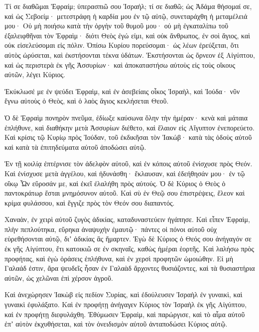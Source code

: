\begin{spacing}{1.1}
\begin{multicols}{2}
Τί σε διαθῶμαι Ἐφραίμ; ὑπερασπιῶ σου Ἰσραήλ; τί σε διαθῶ; ὡς Ἀδάμα θήσομαί σε, καὶ ὡς Σεβοείμ· μετεστράφη ἡ καρδία μου ἐν τῷ αὐτῷ, συνεταράχθη ἡ μεταμέλειά μου·
Οὐ μὴ ποιήσω κατὰ τὴν ὀργὴν τοῦ θυμοῦ μου· οὐ μὴ ἐγκαταλίπω τοῦ ἐξαλειφθῆναι τὸν Ἐφραὶμ· διότι Θεὸς ἐγώ εἰμι, καὶ οὐκ ἄνθρωπος, ἐν σοὶ ἅγιος, καὶ οὐκ εἰσελεύσομαι εἰς πόλιν.
Ὀπίσω Κυρίου πορεύσομαι· ὡς λέων ἐρεύξεται, ὅτι αὐτὸς ὠρύσεται, καὶ ἐκστήσονται τέκνα ὑδάτων.
Ἐκστήσονται ὡς ὄρνεον ἐξ Αἰγύπτου, καὶ ὡς περιστερὰ ἐκ γῆς Ἀσσυρίων· καὶ ἀποκαταστήσω αὐτοὺς εἰς τοὺς οἴκους αὐτῶν, λέγει Κύριος.

Ἐκύκλωσέ με ἐν ψεύδει Ἐφραὶμ, καὶ ἐν ἀσεβείαις οἶκος Ἰσραὴλ, καὶ Ἰούδα· νῦν ἔγνω αὐτοὺς ὁ Θεὸς, καὶ ὁ λαὸς ἅγιος κεκλήσεται Θεοῦ.

Ὁ δὲ Ἐφραὶμ πονηρὸν πνεῦμα, ἐδίωξε καύσωνα ὅλην τὴν ἡμέραν· κενὰ καὶ μάταια ἐπλήθυνε, καὶ διαθήκην μετὰ Ἀσσυρίων διέθετο, καὶ ἔλαιον εἰς Αἴγυπτον ἐνεπορεύετο.
Καὶ κρίσις τῷ Κυρίῳ πρὸς Ἰούδαν, τοῦ ἐκδικῆσαι τὸν Ἰακώβ· κατὰ τὰς ὁδοὺς αὐτοῦ καὶ κατὰ τὰ ἐπιτηδεύματα αὐτοῦ ἀποδώσει αὐτῷ.

Ἐν τῇ κοιλίᾳ ἐπτέρνισε τὸν ἀδελφὸν αὐτοῦ, καὶ ἐν κόποις αὐτοῦ ἐνίσχυσε πρὸς Θεόν.
Καὶ ἐνίσχυσε μετὰ ἀγγέλου, καὶ ἠδυνάσθη· ἔκλαυσαν, καὶ ἐδεήθησάν μου· ἐν τῷ οἴκῳ Ὦν εὕροσάν με, καὶ ἐκεῖ ἐλαλήθη πρὸς αὐτούς.
Ὁ δὲ Κύριος ὁ Θεὸς ὁ παντοκράτωρ ἔσται μνημόσυνον αὐτοῦ.
Καὶ σὺ ἐν Θεῷ σου ἐπιστρέψεις, ἔλεον καὶ κρίμα φυλάσσου, καὶ ἔγγιζε πρὸς τὸν Θεόν σου διαπαντός.

Χαναὰν, ἐν χειρὶ αὐτοῦ ζυγὸς ἀδικίας, καταδυναστεύειν ἠγάπησε.
Καὶ εἶπεν Ἐφραὶμ, πλὴν πεπλούτηκα, εὕρηκα ἀναψυχὴν ἐμαυτῷ· πάντες οἱ πόνοι αὐτοῦ οὐχ εὑρεθήσονται αὐτῷ, διʼ ἀδικίας ἃς ἥμαρτεν.
Ἐγὼ δὲ Κύριος ὁ Θεός σου ἀνήγαγόν σε ἐκ γῆς Αἰγύπτου, ἔτι κατοικιῶ σε ἐν σκηναῖς, καθὼς ἡμέραι ἑορτῆς.
Καὶ λαλήσω πρὸς προφήτας, καὶ ἐγὼ ὁράσεις ἐπλήθυνα, καὶ ἐν χερσὶ προφητῶν ὡμοιώθην.
Εἰ μὴ Γαλαάδ ἐστιν, ἄρα ψευδεῖς ἦσαν ἐν Γαλαὰδ ἄρχοντες θυσιάζοντες, καὶ τὰ θυσιαστήρια αὐτῶν, ὡς χελῶναι ἐπὶ χέρσον ἀγροῦ.

Καὶ ἀνεχώρησεν Ἰακὼβ εἰς πεδίον Συρίας, καὶ ἐδούλευσεν Ἰσραὴλ ἐν γυναικὶ, καὶ γυναικὶ ἐφυλάξατο.
Καὶ ἐν προφήτῃ ἀνήγαγεν Κύριος τὸν Ἰσραὴλ ἐκ γῆς Αἰγύπτου, καὶ ἐν προφήτῃ διεφυλάχθη.
Ἐθύμωσεν Ἐφραὶμ, καὶ παρώργισε, καὶ τὸ αἷμα αὐτοῦ ἐπʼ αὐτὸν ἐκχυθήσεται, καὶ τὸν ὀνειδισμὸν αὐτοῦ ἀνταποδώσει Κύριος αὐτῷ.


\end{multicols}
\end{spacing}
